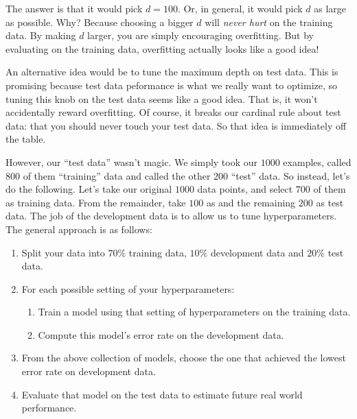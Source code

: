 The answer is that it would pick $d=100$.  Or, in general, it would
pick $d$ as large as possible.  Why?  Because choosing a bigger $d$
will \emph{never hurt} on the training data.  By making $d$ larger,
you are simply encouraging overfitting.  But by evaluating on the
training data, overfitting actually looks like a good idea!

An alternative idea would be to tune the maximum depth on test data.
This is promising because test data peformance is what we really want
to optimize, so tuning this knob on the test data seems like a good
idea.  That is, it won't accidentally reward overfitting.  Of course,
it breaks our cardinal rule about test data: that you should never
touch your test data.  So that idea is immediately off the table.

However, our ``test data'' wasn't magic.  We simply took our $1000$
examples, called $800$ of them ``training'' data and called the other
$200$ ``test'' data.  So instead, let's do the following.  Let's take
our original $1000$ data points, and select $700$ of them as training
data.  From the remainder, take $100$ as  and the remaining $200$ as test
data.  The job of the development data is to allow us to tune
hyperparameters.  The general approach is as follows:

\begin{enumerate}
\item Split your data into $70\%$ training data, $10\%$ development
  data and $20\%$ test data.

\item For each possible setting of your hyperparameters:

\begin{enumerate}
\item Train a model using that setting of hyperparameters on the
  training data.

\item Compute this model's error rate on the development data.
\end{enumerate}

\item From the above collection of models, choose the one that
  achieved the lowest error rate on development data.

\item Evaluate that model on the test data to estimate future real world
  performance.
\end{enumerate}

